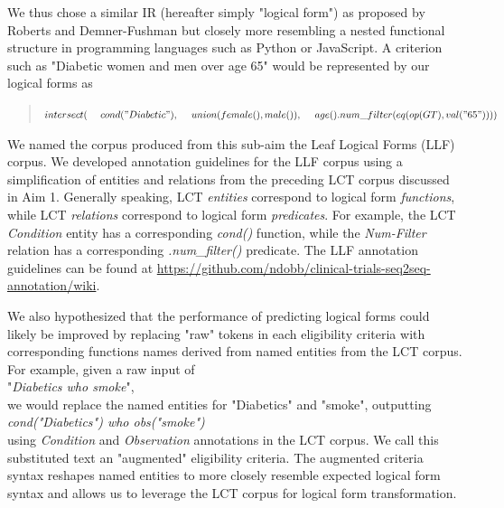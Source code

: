 \documentclass[../main.tex]{subfiles}
\begin{document}
We thus chose a similar IR (hereafter simply "logical form") as proposed by Roberts and Demner-Fushman but closely more resembling a nested functional structure in programming languages such as Python or JavaScript. A criterion such as "Diabetic women and men over age 65" would be represented by our logical forms as

\begin{quote}
$intersect( \\
    \mathrm{\ \ \ \ }cond("Diabetic"), \\
    \mathrm{\ \ \ \ }union(female(), male()),\\
    \mathrm{\ \ \ \ }age().num\_filter(eq(op(GT), val("65"))) \\
)$
\end{quote}

We named the corpus produced from this sub-aim the Leaf Logical Forms (LLF) corpus. We developed annotation guidelines for the LLF corpus using a simplification of entities and relations from the preceding LCT corpus discussed in Aim 1. Generally speaking, LCT \textit{entities} correspond to logical form \textit{functions}, while LCT \textit{relations} correspond to logical form \textit{predicates}. For example, the LCT \textit{Condition} entity has a corresponding \textit{cond()} function, while the \textit{Num-Filter} relation has a corresponding \textit{.num\_filter()} predicate. The LLF annotation guidelines can be found at \url{https://github.com/ndobb/clinical-trials-seq2seq-annotation/wiki}.

We also hypothesized that the performance of predicting logical forms could likely be improved by replacing "raw" tokens in each eligibility criteria with corresponding functions names derived from named entities from the LCT corpus. For example, given a raw input of \\

"\textit{Diabetics who smoke}", \\

\noindent we would replace the named entities for "Diabetics" and "smoke", outputting \\ 

\textit{cond("Diabetics") who obs("smoke")} \\

\noindent using \textit{Condition} and \textit{Observation} annotations in the LCT corpus. We call this substituted text an "augmented" eligibility criteria. The augmented criteria syntax reshapes named entities to more closely resemble expected logical form syntax and allows us to leverage the LCT corpus for logical form transformation.
\end{document}
